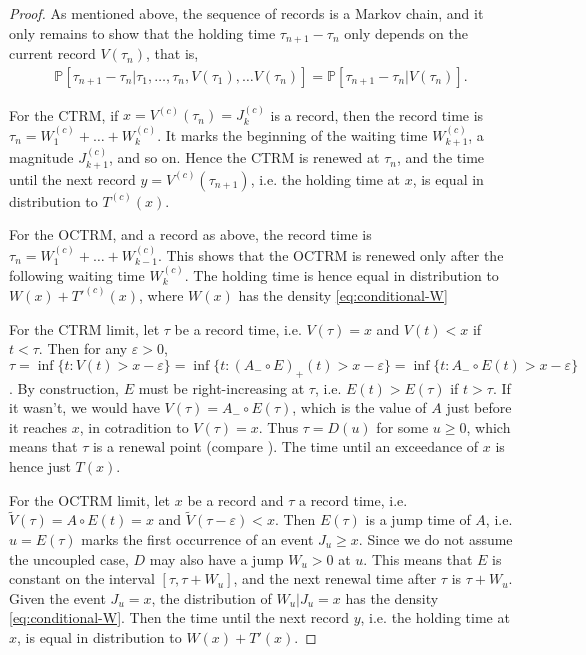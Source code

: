 \documentclass[12pt, a4paper]{article}
\newcommand{\PP}{\mathbb{P}}
\newcommand{\1}{\mathbf 1}
\newcommand{\eps}{\varepsilon}
\begin{document}
\begin{proof}
  As mentioned above, the sequence of records is a Markov chain, and it only 
remains to show that the holding time $\tau_{n+1} - \tau_n$ only depends on 
the current record $V(\tau_n)$, that is, 
\begin{align}
  \PP[\tau_{n+1} - \tau_n | \tau_1, \ldots, \tau_n, V(\tau_1), \ldots V(\tau_n)]
  = \PP[\tau_{n+1} - \tau_n | V(\tau_n)].
\end{align}

For the CTRM, if $x = V^{(c)}(\tau_n) = J^{(c)}_k$ is a record, then the record time 
is $\tau_n = W^{(c)}_1 + \ldots + W^{(c)}_k$.
It marks the beginning of the waiting time $W^{(c)}_{k + 1}$, a magnitude
$J^{(c)}_{k+1}$, and so on.
Hence the CTRM is renewed at $\tau_n$, and the time until 
the next record $y = V^{(c)}(\tau_{n+1})$, i.e. the holding time at $x$, is
equal in distribution to $T^{(c)}(x)$.

For the OCTRM, and a record as above, 
the record time is $\tau_n = W^{(c)}_1 + \ldots + W^{(c)}_{k-1}$.
This shows that the OCTRM is renewed only after the following waiting time $W^{(c)}_k$. 
The holding time is hence equal in distribution to 
$W(x) + T'^{(c)}(x)$, 
where $W(x)$ has the density \eqref{eq:conditional-W}

For the CTRM limit, let $\tau$ be a record time, i.e. $V(\tau) = x$ and  
$V(t) < x$ if $t < \tau$. 
Then for any $\eps > 0$, 
$\tau = \inf\{t: V(t) > x-\eps\} = \inf\{t: (A_- \circ E)_+(t) > x-\eps\}
= \inf\{t: A_- \circ E(t) > x-\eps\}$.
By construction, $E$ must be right-increasing at $\tau$, 
i.e. $E(t) > E(\tau)$ if $t > \tau$. If it wasn't, we would have
$V(\tau) = A_- \circ E(\tau)$, which is the value of $A$ just before it reaches 
$x$, in cotradition to $V(\tau) = x$.
Thus $\tau = D(u)$ for some $u \ge 0$, which means that $\tau$ is a renewal point
(compare \cite{Bertoin04}). 
The time until an exceedance of $x$ is hence just $T(x)$. 

For the OCTRM limit, let $x$ be a record and $\tau$ a record time, i.e. 
$\tilde V(\tau) = A \circ E(t) = x$ and $\tilde V(\tau - \eps) < x$. 
Then $E(\tau)$ is a jump time of $A$, i.e. $u = E(\tau)$ marks the first occurrence 
of an event $J_u \ge x$. 
Since we do not assume the uncoupled
case, $D$ may also have a jump $W_u > 0$ at $u$. 
This means that $E$ is constant on the interval $[\tau, \tau + W_u]$, 
and the next renewal time after $\tau$ is $\tau + W_u$.
Given the event $J_u = x$, the distribution of $W_u | J_u = x$ 
has the density \eqref{eq:conditional-W}.
Then the time until the next record $y$, i.e. the holding time at $x$, is 
equal in distribution to $W(x) + T'(x)$. 
\end{proof}
\end{document}
